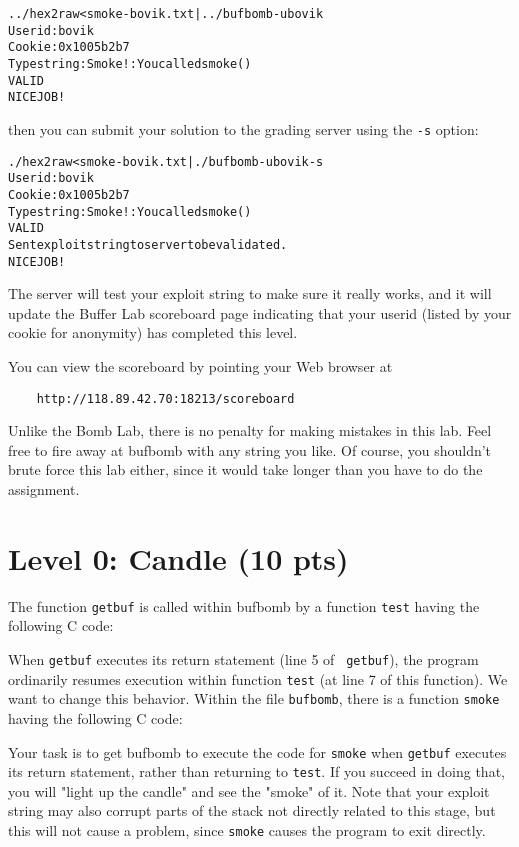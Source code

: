 \documentclass[11pt]{article}
\newenvironment{ccode}%
{\small}%
{}
\newenvironment{tty}%
{\small\begin{alltt}}%
{\end{alltt}}
\begin{document}
\begin{tty}
    ../hex2raw < smoke-bovik.txt | ../bufbomb -u bovik 
    Userid: bovik
    Cookie: 0x1005b2b7
    Type string:Smoke!: You called smoke()
    VALID
    NICE JOB!
\end{tty}
then you can submit your 
solution to the grading server using the \texttt{-s} option:
\begin{tty}
    ./hex2raw < smoke-bovik.txt | ./bufbomb -u bovik -s
    Userid: bovik
    Cookie: 0x1005b2b7
    Type string:Smoke!: You called smoke()
    VALID
    Sent exploit string to server to be validated.
    NICE JOB!
\end{tty}
The server will test your exploit string to make sure it really works,
and it will update the Buffer Lab scoreboard page indicating that your
userid (listed by your cookie for anonymity) has completed this level.

You can view the scoreboard by pointing your Web browser at 
\begin{verbatim}
    http://118.89.42.70:18213/scoreboard
\end{verbatim}

Unlike the Bomb Lab, there is no penalty for making mistakes in this
lab.  Feel free to fire away at {\sc bufbomb} with any string you
like.  Of course, you shouldn't brute force this lab either, since it
would take longer than you have to do the assignment.


\section*{Level 0: Candle (10 pts)}

The function {\tt getbuf} is called within {\sc bufbomb} by a function
{\tt test} having the following C code:

\begin{ccode}

\end{ccode}

When {\tt getbuf} executes its return statement (line 5 of {\tt
getbuf}), the program ordinarily resumes execution within function
{\tt test} (at line 7 of this function). We want to change this behavior.
Within the file {\tt bufbomb}, there is a function {\tt smoke} having
the following C code:

\begin{ccode}

\end{ccode}

Your task is to get {\sc bufbomb} to execute the code for {\tt smoke}
when {\tt getbuf} executes its return statement, rather than returning
to {\tt test}.  If you succeed in doing that, you will "light up the candle" and see the "smoke" of it.
Note that your exploit string may also corrupt parts
of the stack not directly related to this stage, but this will not
cause a problem, since {\tt smoke} causes the program to exit
directly.
\end{document}
